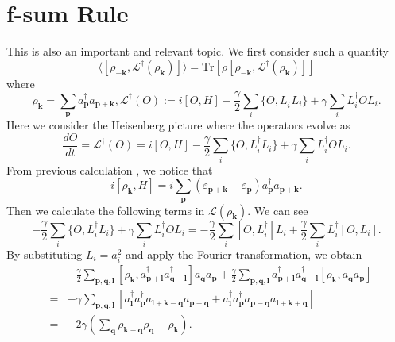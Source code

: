 \documentclass[aps,superscriptaddress,notitlepage,longbibliography]{revtex4-1}
\begin{document}
\section{f-sum Rule}

This is also an important and relevant topic. We first consider such
a quantity 
\begin{equation}
\langle[\rho_{-\bm{k}},\mathcal{L}^{\dagger}(\rho_{\bm{k}})]\rangle=\text{Tr}[\rho[\rho_{-\bm{k}},\mathcal{L}^{\dagger}(\rho_{\bm{k}})]]
\end{equation}
where 
\begin{equation}
\rho_{\bm{k}}=\sum_{\bm{p}}a_{\bm{p}}^{\dagger}a_{\bm{p}+\bm{k}},\mathcal{L}^{\dagger}(O):=i[O,H]-\frac{\gamma}{2}\sum_{i}\{O,L_{i}^{\dagger}L_{i}\}+\gamma\sum_{i}L_{i}^{\dagger}OL_{i}.
\end{equation}
Here we consider the Heisenberg picture where the operators evolve
as 
\begin{equation}
\frac{dO}{dt}=\mathcal{L}^{\dagger}(O)=i[O,H]-\frac{\gamma}{2}\sum_{i}\{O,L_{i}^{\dagger}L_{i}\}+\gamma\sum_{i}L_{i}^{\dagger}OL_{i}.\label{eq:Ldynamics}
\end{equation}
From previous calculation \citep{Ueda2010}, we notice that 
\begin{equation}
i\left[{\rho_{\bm{k}}},H\right]=i\sum_{\bm{p}}(\varepsilon_{\bm{p}+\bm{k}}-\varepsilon_{\bm{p}})a_{\bm{p}}^{\dagger}a_{\bm{p}+\bm{k}}.
\end{equation}
Then we calculate the following terms in $\mathcal{L}(\rho_{\bm{k}})$.
We can see 
\begin{equation}
-\frac{\gamma}{2}\sum_{i}\{O,L_{i}^{\dagger}L_{i}\}+\gamma\sum_{i}L_{i}^{\dagger}OL_{i}=-\frac{\gamma}{2}\sum_{i}[O,L_{i}^{\dagger}]L_{i}+\frac{\gamma}{2}\sum_{i}L_{i}^{\dagger}[O,L_{i}].
\end{equation}
By substituting $L_{i}=a_{i}^{2}$ and apply the Fourier transformation,
we obtain 
\begin{eqnarray}
 &  & -\frac{\gamma}{2}\sum_{\bm{p},\bm{q},\bm{l}}[\rho_{\bm{k}},a_{\bm{p}+\bm{l}}^{\dagger}a_{\bm{q}-\bm{l}}^{\dagger}]a_{\bm{q}}a_{\bm{p}}+\frac{\gamma}{2}\sum_{\bm{p},\bm{q},\bm{l}}a_{\bm{p}+\bm{l}}^{\dagger}a_{\bm{q}-\bm{l}}^{\dagger}[\rho_{\bm{k}},a_{\bm{q}}a_{\bm{p}}]\nonumber \\
 & = & -\gamma\sum_{\bm{p},\bm{q},\bm{l}}\left[a_{\bm{l}}^{\dagger}a_{\bm{p}}^{\dagger}a_{\bm{l}+\bm{k}-\bm{q}}a_{\bm{p}+\bm{q}}+a_{\bm{l}}^{\dagger}a_{\bm{p}}^{\dagger}a_{\bm{p}-\bm{q}}{a_{\bm{l}+\bm{k}+\bm{q}}}\right]\nonumber \\
 & = & -2\gamma\left(\sum_{\bm{q}}\rho_{\bm{k}-\bm{q}}\rho_{\bm{q}}-\rho_{\bm{k}}\right).
\end{eqnarray}
\end{document}
